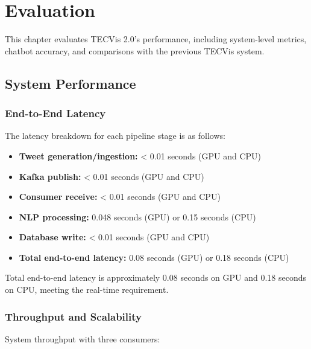 
\chapter{Evaluation}
\label{Chapter6}


This chapter evaluates TECVis 2.0's performance, including system-level metrics, chatbot accuracy, and comparisons with the previous TECVis system.


\section{System Performance}

\subsection{End-to-End Latency}

The latency breakdown for each pipeline stage is as follows:

\begin{itemize}
\item \textbf{Tweet generation/ingestion:} < 0.01 seconds (GPU and CPU)
\item \textbf{Kafka publish:} < 0.01 seconds (GPU and CPU)
\item \textbf{Consumer receive:} < 0.01 seconds (GPU and CPU)
\item \textbf{NLP processing:} 0.048 seconds (GPU) or 0.15 seconds (CPU)
\item \textbf{Database write:} < 0.01 seconds (GPU and CPU)
\item \textbf{Total end-to-end latency:} 0.08 seconds (GPU) or 0.18 seconds (CPU)
\end{itemize}

Total end-to-end latency is approximately 0.08 seconds on GPU and 0.18 seconds on CPU, meeting the real-time requirement.

\subsection{Throughput and Scalability}

System throughput with three consumers:

